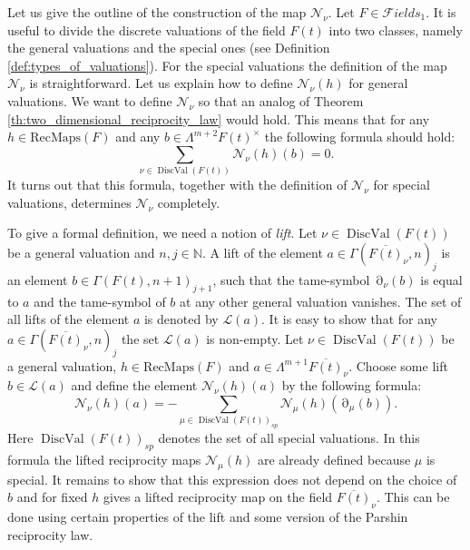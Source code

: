 \documentclass[12pt]{extarticle}
\def\mc{\mathcal}
\def\L{\Lambda}
\def\N{\mc N}
\def\ol{\overline}
\def\F{{\mc Fields}}
\newcommand{\SRL}{\mathrm{RecMaps}}
\DeclareMathOperator{\ts}{\partial}
\DeclareMathOperator{\dval}{DiscVal}
\begin{document}
 Let us give the outline of the construction of the map $\mc N_\nu$. Let $F\in \F_1$. It is useful to divide the discrete valuations of the field $F(t)$ into two classes, namely  the general valuations and the special ones (see Definition \ref{def:types_of_valuations}). For the special valuations the definition of the map $\N_\nu$ is straightforward. Let us explain how to define $\mc N_\nu(h)$ for general valuations. We want to define $\mc N_\nu$ so that an analog of Theorem \ref{th:two_dimensional_reciprocity_law} would hold. This means that for any $h\in\SRL(F)$ and any $b\in \L^{m+2}F(t)^\times$ the following formula should hold:
 $$\sum\limits_{\nu\in \dval(F(t))}\mc N_\nu(h)(b)=0.$$
It turns out that this formula, together with the definition of $\mc N_\nu$ for special valuations, determines $\mc N_\nu$ completely. 
 
 To give a formal definition, we need a notion of \emph{lift}. Let $\nu\in \dval(F(t))$ be a general valuation and $n,j\in\mathbb N$. A lift of the element $a\in \Gamma(\overline{F(t)}_\nu, n)_j$ is an element $b\in \Gamma(F(t), n+1)_{j+1}$, such that the tame-symbol $\ts_\nu(b)$ is equal to $a$ and the tame-symbol of $b$ at any other general valuation vanishes. The set of all lifts of the element $a$ is denoted by $\mathcal L(a)$. It is easy to show that for any $a\in \Gamma(\ol {F(t)}_\nu,n)_j$ the set $\mathcal L(a)$ is non-empty. Let $\nu\in \dval(F(t))$ be a general valuation, $h\in \SRL(F)$ and $a\in \Lambda^{m+1}\overline{F(t)}_\nu$. Choose some lift $b\in \mathcal L(a)$ and define the element $\N_\nu(h)(a)$ by the following formula:
$$\mathcal N_\nu(h)(a)=-\sum\limits_{\mu\in\dval(F(t))_{sp}}\mathcal N_{\mu}(h)(\ts_\mu(b)).$$
Here $\dval(F(t))_{sp}$ denotes the set of all special valuations. In this formula the lifted reciprocity maps $\N_{\mu}(h)$ are already defined because $\mu$ is special. It remains to show that this expression does not depend on the choice of $b$ and for fixed $h$ gives a lifted reciprocity map on the field $\overline{F(t)}_\nu$. This can be done using certain properties of the lift and some version of the Parshin reciprocity law.


\end{document}
